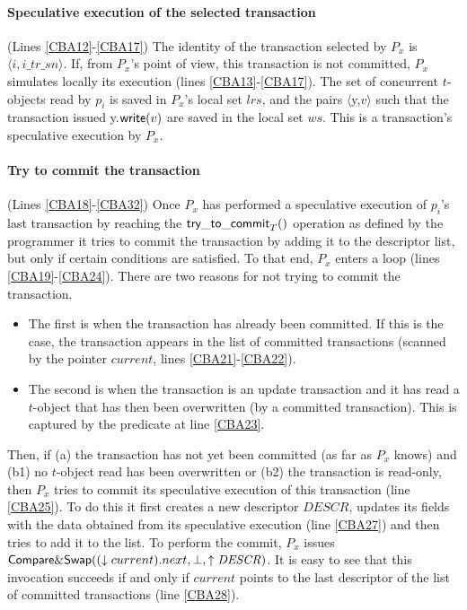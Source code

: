 \paragraph{Speculative execution of the selected  transaction} 
(Lines \ref{CBA12}-\ref{CBA17}) 
The identity of the transaction selected by $P_x$ is 
$\langle i,  i\_tr\_sn \rangle$. 
If,  from $P_x$'s point of view, this transaction  is not committed, $P_x$ 
simulates locally its execution (lines \ref{CBA13}-\ref{CBA17}).
The set of concurrent $t$-objects read by $p_i$ is  saved in $P_x$'s local
set $\mathit{lrs}$, and the  pairs $\langle${\sc y},$v\rangle$ 
such that the transaction issued {\sc y}.${\sf write}(v)$ are saved in 
the local set $ws$. This is a transaction's speculative execution by $P_x$. 

\paragraph{Try to commit the transaction}
 (Lines \ref{CBA18}-\ref{CBA32}) Once $P_x$ has performed a speculative
 execution of $p_i$'s  last transaction by reaching the ${\sf try\_to\_commit}_T()$
 operation as defined by the programmer it tries to commit the transaction by adding it
to the descriptor list, but only if certain conditions are satisfied.
To that end, $P_x$  enters a loop (lines \ref{CBA19}-\ref{CBA24}). 
There are two reasons for not trying to commit the transaction.
%
\begin{itemize}
\item
The first is when  the transaction has already  been committed. 
If this is the case, the transaction  appears in the list of committed 
transactions (scanned by the pointer $current$, lines \ref{CBA21}-\ref{CBA22}).
%
\item
The second is when the transaction is an update transaction and it
has read a $t$-object that  has then been overwritten (by a committed 
transaction). This is  captured by the predicate at line \ref{CBA23}.
\end{itemize}

Then, if (a) the  transaction has not yet been  committed 
(as far as $P_x$ knows) and (b1) no $t$-object read has been overwritten  or 
(b2) the transaction is read-only, then $P_x$ tries to
commit its speculative execution of this transaction (line \ref{CBA25}).
To do this it first creates a new descriptor $\mathit{DESCR}$,
updates its fields  with the data obtained from its speculative execution
 (line \ref{CBA27}) and then tries to add it to the list. 
%
To perform  the commit, $P_x$ issues ${\sf Compare\&Swap}
((\downarrow current).next,\bot,\uparrow \mathit{DESCR})$.
It is easy to see that this invocation succeeds if and only if $current$ 
points to the last  descriptor of the list of committed transactions 
(line \ref{CBA28}).

